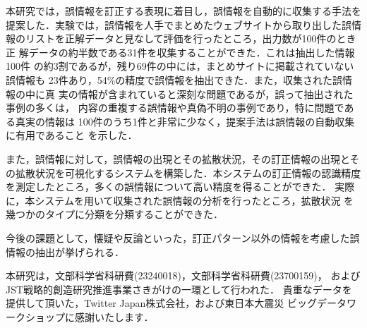 \documentclass[japanese]{jnlp_1.4}
\begin{document}
本研究では，誤情報を訂正する表現に着目し，誤情報を自動的に収集する手法を
提案した．実験では，誤情報を人手でまとめたウェブサイトから取り出した誤情
報のリストを正解データと見なして評価を行ったところ，出力数が100件のとき正
解データの約半数である31件を収集することができた．これは抽出した情報100件
の約3割であるが，残り69件の中には，まとめサイトに掲載されていない誤情報も
23件あり，54\%の精度で誤情報を抽出できた．また，収集された誤情報の中に真
実の情報が含まれていると深刻な問題であるが，誤って抽出された事例の多くは，
内容の重複する誤情報や真偽不明の事例であり，特に問題である真実の情報は
100件のうち1件と非常に少なく，提案手法は誤情報の自動収集に有用であること
を示した．

また，誤情報に対して，誤情報の出現とその拡散状況，その訂正情報の出現とそ
の拡散状況を可視化するシステムを構築した．本システムの訂正情報の認識精度
を測定したところ，多くの誤情報について高い精度を得ることができた．
実際に，本システムを用いて収集された誤情報の分析を行ったところ，拡散状況
を幾つかのタイプに分類を分類することができた．

今後の課題として，懐疑や反論といった，訂正パターン以外の情報を考慮した誤
情報の抽出が挙げられる．


\acknowledgment
本研究は，文部科学省科研費(23240018)，文部科学省科研費(23700159)，
およびJST戦略的創造研究推進事業さきがけの一環として行われた．
貴重なデータを提供して頂いた，Twitter Japan株式会社，および東日本大震災
ビッグデータワークショップに感謝いたします．
\end{document}
